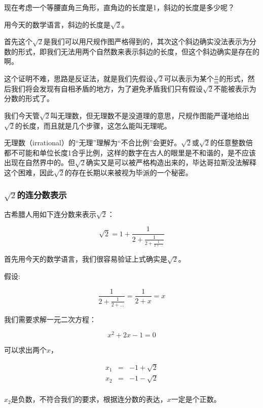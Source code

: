 现在考虑一个等腰直角三角形，直角边的长度是1，斜边的长度是多少呢？

用今天的数学语言，斜边的长度是$\sqrt{2}$。

首先这个$\sqrt{2}$是我们可以用尺规作图严格得到的，其次这个斜边确实没法表示为分数的形式，即我们无法用两个自然数来表示斜边的长度，但这个斜边确实是存在的啊。

这个证明不难，思路是反证法，就是我们先假设$\sqrt{2}$可以表示为某个$\frac{n}{m}$的形式，然后我们将会发现有自相矛盾的地方，为了避免矛盾我们只有假设$\sqrt{2}$不能被表示为分数的形式了。

我们今天管$\sqrt{2}$叫无理数，但无理数不是没道理的意思，尺规作图能严谨地给出$\sqrt{2}$的长度，而且就是几个步骤，这怎么能叫无理呢。

无理数（irrational）的“无理”理解为“不合比例”会更好。$\sqrt{2}$或$\sqrt{2}$的任意整数倍都不可能和单位长度1合乎比例，这样的数字在古人的眼里是不和谐的，是不应该出现在自然界中的。但$\sqrt{2}$确实又是可以被严格构造出来的，毕达哥拉斯没法解释这个困难，因此$\sqrt{2}$的存在长期以来被视为毕派的一个秘密。

\subsubsection{$\sqrt{2}$的连分数表示}

古希腊人用如下连分数来表示$\sqrt{2}$：

\begin{equation}
\sqrt{2} = 1 + \frac{1}{ 2 + \frac{1}{ 2 + \frac{1}{2+ ...} }}
\end{equation}

首先用今天的数学语言，我们很容易验证上式确实是$\sqrt{2}$。

假设:

\begin{equation*}
\frac{1}{2 + \frac{1}{2+ ...}} = \frac{1}{2 + x} = x
\end{equation*}

我们需要求解一元二次方程：

\begin{equation*}
x^2 + 2 x -1 =0
\end{equation*}

可以求出两个$x$，

\begin{eqnarray*}
x_1 & = & -1 + \sqrt{2} \\
x_2 & = & -1 - \sqrt{2} \\
\end{eqnarray*}

$x_2$是负数，不符合我们的要求，根据连分数的表达，$x$一定是个正数。

